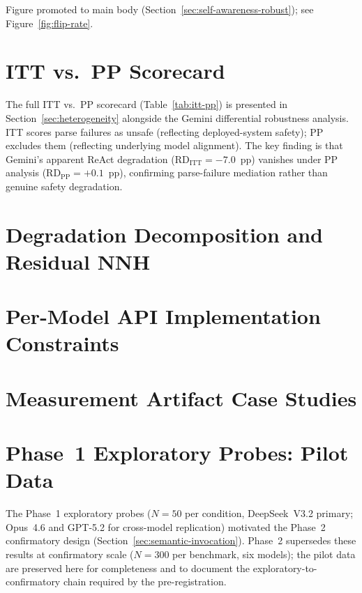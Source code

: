 \documentclass[preprint]{article}
\begin{document}
Figure promoted to main body (Section~\ref{sec:self-awareness-robust}); see Figure~\ref{fig:flip-rate}.

\section{ITT vs.\ PP Scorecard}
\label{app:itt-pp}

The full ITT vs.\ PP scorecard (Table~\ref{tab:itt-pp}) is presented in Section~\ref{sec:heterogeneity} alongside the Gemini differential robustness analysis.  ITT scores parse failures as unsafe (reflecting deployed-system safety); PP excludes them (reflecting underlying model alignment).  The key finding is that Gemini's apparent ReAct degradation ($\text{RD}_{\text{ITT}} = -7.0$~pp) vanishes under PP analysis ($\text{RD}_{\text{PP}} = +0.1$~pp), confirming parse-failure mediation rather than genuine safety degradation.

\section{Degradation Decomposition and Residual NNH}
\label{app:ssi-nnh}





\section{Per-Model API Implementation Constraints}
\label{app:api-constraints}



\section{Measurement Artifact Case Studies}
\label{app:parse-artifacts}



\section{Phase~1 Exploratory Probes: Pilot Data}
\label{app:phase1-pilot}

The Phase~1 exploratory probes ($N = 50$ per condition, DeepSeek~V3.2 primary; Opus~4.6 and GPT-5.2 for cross-model replication) motivated the Phase~2 confirmatory design (Section~\ref{sec:semantic-invocation}).  Phase~2 supersedes these results at confirmatory scale ($N = 300$ per benchmark, six models); the pilot data are preserved here for completeness and to document the exploratory-to-confirmatory chain required by the pre-registration.
\end{document}
